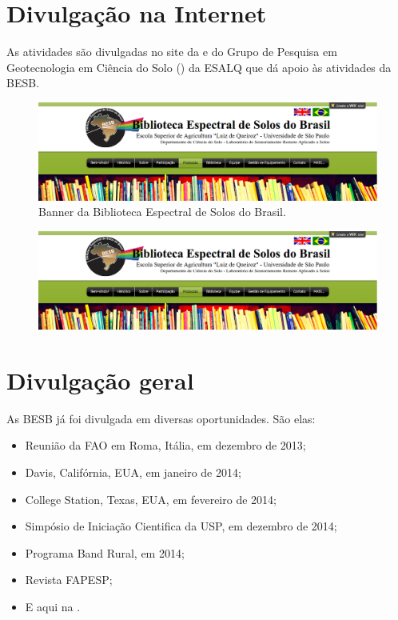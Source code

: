 \section{Divulgação na Internet}

As atividades são divulgadas no site da \BESB{} e do Grupo de Pesquisa em Geotecnologia em Ciência do Solo (\GeoCIS) da ESALQ que dá apoio às atividades da BESB.

\begin{figure}[tb!]
\begin{minipage}[t]{1\linewidth}
   \centering
   \includegraphics{figuras/image008}
   \caption{Banner da Biblioteca Espectral de Solos do Brasil.}
   \label{fig:banner}
\end{minipage}
\end{figure}

\begin{figure}
  \includegraphics{figuras/image008}
\end{figure}

\section{Divulgação geral}

As BESB já foi divulgada em diversas oportunidades. São elas:

\begin{itemize}
  \item Reunião da FAO em Roma, Itália, em dezembro de 2013;
  \item Davis, Califórnia, EUA, em janeiro de 2014;
  \item College Station, Texas, EUA, em fevereiro de 2014;
  \item Simpósio de Iniciação Cientifica da USP, em dezembro de 2014;
  \item Programa Band Rural, em 2014;
  \item Revista FAPESP;
  \item E aqui na \pedometria.
\end{itemize}

